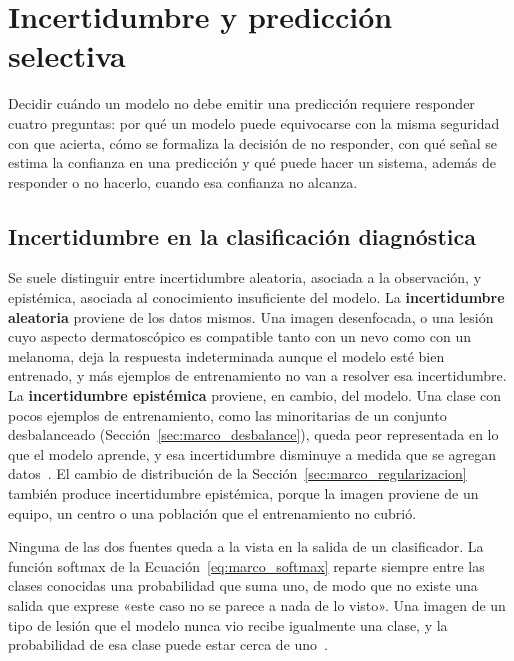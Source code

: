 \section{Incertidumbre y predicción selectiva}
\label{sec:marco_incertidumbre}

Decidir cuándo un modelo no debe emitir una predicción requiere responder cuatro preguntas: por qué un modelo
puede equivocarse con la misma seguridad con que acierta, cómo se formaliza la decisión de no responder, con qué
señal se estima la confianza en una predicción y qué puede hacer un sistema, además de responder o no hacerlo,
cuando esa confianza no alcanza.

\subsection{Incertidumbre en la clasificación diagnóstica}
\label{sec:marco_incert_fuentes}

Se suele distinguir entre incertidumbre aleatoria, asociada a la observación, y epistémica, asociada al conocimiento insuficiente del modelo. La \textbf{incertidumbre aleatoria} proviene de los datos mismos. Una imagen desenfocada, o una lesión cuyo
aspecto dermatoscópico es compatible tanto con un nevo como con un melanoma, deja la respuesta indeterminada
aunque el modelo esté bien entrenado, y más ejemplos de entrenamiento no van a resolver esa incertidumbre. La \textbf{incertidumbre
epistémica} proviene, en cambio, del modelo. Una clase con pocos ejemplos de entrenamiento, como las
minoritarias de un conjunto desbalanceado (Sección~\ref{sec:marco_desbalance}), queda peor representada en lo
que el modelo aprende, y esa incertidumbre disminuye a medida que se agregan datos~\cite{kendall2017uncertainties}.
El cambio de distribución de la Sección~\ref{sec:marco_regularizacion} también produce incertidumbre epistémica,
porque la imagen proviene de un equipo, un centro o una población que el entrenamiento no cubrió.

Ninguna de las dos fuentes queda a la vista en la salida de un clasificador. La función softmax de la
Ecuación~\ref{eq:marco_softmax} reparte siempre entre las clases conocidas una probabilidad que suma uno, de modo
que no existe una salida que exprese «este caso no se parece a nada de lo visto». Una imagen de un tipo de lesión
que el modelo nunca vio recibe igualmente una clase, y la probabilidad de esa clase puede estar cerca de
uno~\cite{hendrycks2017baseline}.

